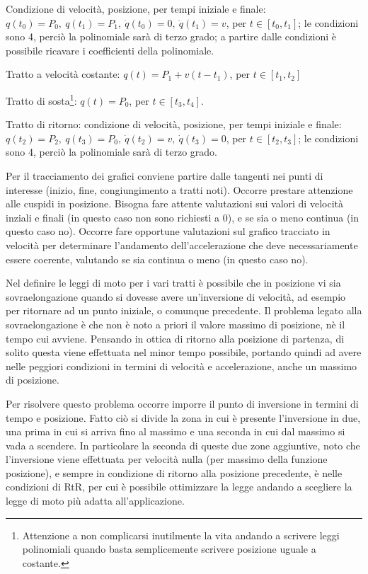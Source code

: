 Condizione di velocità, posizione, per tempi iniziale e finale: \(q(t_0)=P_0, \ q(t_1)=P_1, \ \dot{q}(t_0)=0, \ \dot{q}(t_1)=v \), per \(t\in [t_0,t_1]\); le condizioni sono 4, perciò la polinomiale sarà di terzo grado; a partire dalle condizioni è possibile ricavare i coefficienti della polinomiale.

Tratto a velocità costante: \(q(t)=P_1+v(t-t_1)\), per \(t\in [t_1,t_2]\)

Tratto di sosta\footnote{Attenzione a non complicarsi inutilmente la vita andando a scrivere leggi polinomiali quando basta semplicemente scrivere posizione uguale a costante.}: \(q(t)=P_0\), per \(t\in [t_3,t_4]\).

Tratto di ritorno: condizione di velocità, posizione, per tempi iniziale e finale: \(q(t_2)=P_2, \ q(t_3)=P_0, \ \dot{q}(t_2)=v, \ \dot{q}(t_3)=0 \), per \(t\in [t_2,t_3]\); le condizioni sono 4, perciò la polinomiale sarà di terzo grado.

Per il tracciamento dei grafici conviene partire dalle tangenti nei punti di interesse (inizio, fine, congiungimento a tratti noti). 
Occorre prestare attenzione alle cuspidi in posizione. 
Bisogna fare attente valutazioni sui valori di velocità inziali e finali (in questo caso non sono richiesti a 0), e se sia o meno continua (in questo caso no).
Occorre fare opportune valutazioni sul grafico tracciato in velocità per determinare l'andamento dell'accelerazione che deve necessariamente essere coerente, valutando se sia continua o meno (in questo caso no).

Nel definire le leggi di moto per i vari tratti è possibile che in posizione vi sia sovraelongazione quando si dovesse avere un'inversione di velocità, ad esempio per ritornare ad un punto iniziale, o comunque precedente. Il problema legato alla sovraelongazione è che non è noto a priori il valore massimo di posizione, nè il tempo cui avviene. Pensando in ottica di ritorno alla posizione di partenza, di solito questa viene effettuata nel minor tempo possibile, portando quindi ad avere nelle peggiori condizioni in termini di velocità e accelerazione, anche un massimo di posizione.

Per risolvere questo problema occorre imporre il punto di inversione in termini di tempo e posizione. Fatto ciò si divide la zona in cui è presente l'inversione in due, una prima in cui si arriva fino al massimo e una seconda in cui dal massimo si vada a scendere. In particolare la seconda di queste due zone aggiuntive, noto che l'inversione viene effettuata per velocità nulla (per massimo della funzione posizione), e sempre in condizione di ritorno alla posizione precedente, è nelle condizioni di RtR, per cui è possibile ottimizzare la legge andando a scegliere la legge di moto più adatta all'applicazione.

